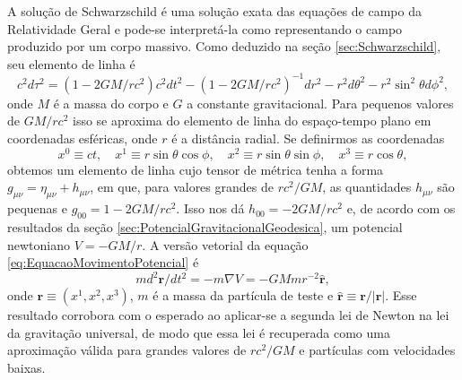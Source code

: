 A solução de Schwarzschild é uma solução exata das equações de campo da Relatividade Geral e pode-se interpretá-la como representando o campo produzido por um corpo massivo. Como deduzido na seção \ref{sec:Schwarzschild}, seu elemento de linha é
\[c^{2} d \tau^{2}=\left(1-2 G M / r c^{2}\right) c^{2} d t^{2}-\left(1-2 G M / r c^{2}\right)^{-1} d r^{2}-r^{2} d \theta^{2}-r^{2} \sin ^{2} \theta d \phi^{2},\]
onde $ M $ é a massa do corpo e $ G $ a constante gravitacional. Para pequenos valores de $ GM/rc^2 $ isso se aproxima do elemento de linha do espaço-tempo plano em coordenadas esféricas, onde $ r $ é a distância radial. Se definirmos as coordenadas
\[x^{0} \equiv c t, \quad x^{1} \equiv r \sin \theta \cos \phi, \quad x^{2} \equiv r \sin \theta \sin \phi, \quad x^{3} \equiv r \cos \theta,\]
obtemos um elemento de linha cujo tensor de métrica tenha a forma $ g_{\mu\nu} =\eta_{\mu \nu}+h_{\mu\nu} $, em que, para valores grandes de $ rc^2/GM $, as quantidades $ h_{\mu\nu} $ são pequenas e $ g_{00}=1-2GM/rc^2 $.  Isso nos dá $ h_{00} = -2GM/rc^2 $ e, de acordo com os resultados da seção \ref{sec:PotencialGravitacionalGeodesica}, um potencial newtoniano $ V = -GM/r $. A versão vetorial da equação \eqref{eq:EquacaoMovimentoPotencial} é 
\[
m d^{2} \mathbf{r} / d t^{2}=-m \nabla V=-G M m r^{-2} \hat{\mathbf{r}}
,\]
onde $ \mathbf{r} \equiv\left(x^{1}, x^{2}, x^{3}\right) $, $ m $ é a massa da partícula de teste e $ \hat{\mathbf{r}}\equiv \mathbf{r}/|\mathbf{r}| $. Esse resultado corrobora com o esperado ao aplicar-se a segunda lei de Newton na lei da gravitação universal, de modo que essa lei é recuperada como uma aproximação válida para grandes valores de $ rc^2/GM $ e partículas com velocidades baixas.



